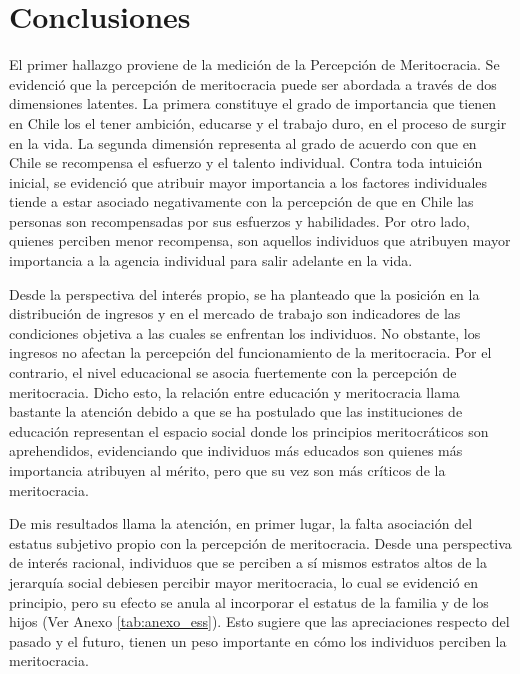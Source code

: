 \documentclass[12pt]{article}
\begin{document}
\newpage
\section{Conclusiones}

El primer hallazgo proviene de la medición de la Percepción de Meritocracia. Se evidenció que la percepción de meritocracia puede ser abordada a través de dos dimensiones latentes. La primera constituye el grado de importancia que tienen en Chile los el tener ambición, educarse y el trabajo duro, en el proceso de surgir en la vida. La segunda dimensión representa al grado de acuerdo con que en Chile se recompensa el esfuerzo y el talento individual. Contra toda intuición inicial, se evidenció que atribuir mayor importancia a los factores individuales tiende a estar asociado negativamente con la percepción de que en Chile las personas son recompensadas por sus esfuerzos y habilidades. Por otro lado, quienes perciben menor recompensa, son aquellos individuos que atribuyen mayor importancia a la agencia individual para salir adelante en la vida. 

Desde la perspectiva del interés propio, se ha planteado que la posición en la distribución de ingresos y en el mercado de trabajo son indicadores de las condiciones objetiva a las cuales se enfrentan los individuos. No obstante, los ingresos no afectan la percepción del funcionamiento de la meritocracia. Por el contrario, el nivel educacional se asocia fuertemente con la percepción de meritocracia. Dicho esto, la relación entre educación y meritocracia llama bastante la atención debido a que se ha postulado que las instituciones de educación representan el espacio social donde los principios meritocráticos son aprehendidos, evidenciando que individuos más educados son quienes más importancia atribuyen al mérito, pero que su vez son más críticos de la meritocracia. 

De mis resultados llama la atención, en primer lugar, la falta asociación del estatus subjetivo propio con la percepción de meritocracia. Desde una perspectiva de interés racional, individuos que se perciben a sí mismos estratos altos de la jerarquía social debiesen percibir mayor meritocracia, lo cual se evidenció en principio, pero su efecto se anula al incorporar el estatus de la familia y de los hijos (Ver Anexo \ref{tab:anexo_ess}). Esto sugiere que las apreciaciones respecto del pasado y el futuro, tienen un peso importante en cómo los individuos perciben la meritocracia. 
\end{document}
